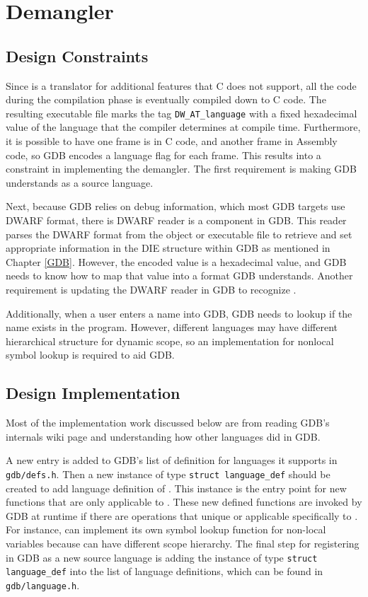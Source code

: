 \chapter{\CFAS Demangler} \label{demangler}

\section{Design Constraints}
Since \CFAS is a translator for additional features that C does not support, all
the code during the compilation phase is eventually compiled down to C code.
The resulting executable file marks the tag \verb|DW_AT_language| with a
fixed hexadecimal value of the language that the compiler determines at compile
time. Furthermore, it is possible to have one frame is in C code, and another
frame in Assembly code, so GDB encodes a language flag for each frame. This
results into a constraint in implementing the demangler. The first requirement is
making GDB understands \CFAS as a source language.

Next, because GDB relies on debug information, which most GDB targets use DWARF
format, there is DWARF reader is a component in GDB. This reader parses the DWARF format from the object or
executable file to retrieve and set
appropriate information in the DIE structure within GDB as mentioned in Chapter
\ref{GDB}. However, the encoded value is a hexadecimal value, and GDB needs to
know how to map that value into a format GDB understands.
Another requirement is updating the DWARF reader in GDB to recognize \CFA.

Additionally, when a user enters a name into GDB, GDB needs to lookup if the
name exists in the program. However, different languages may have different
hierarchical structure for dynamic scope, so an implementation for nonlocal
symbol lookup is required to aid GDB.

\section{Design Implementation}
Most of the implementation work discussed below are from reading GDB's internals
wiki page and understanding how other languages did in GDB\cite{reference5}.

A new entry is added to GDB's list of definition for languages it supports in
\verb|gdb/defs.h|. Then a new instance of type \verb|struct language_def|
should be created to add language definition of \CFAS. This instance is the
entry point for new functions that are only applicable to \CFA. These new
defined functions are invoked by GDB at runtime if there are operations that
unique or applicable specifically to \CFA. For instance, \CFAS can implement its
own symbol lookup function for non-local variables because \CFAS can have
different scope hierarchy. The final step for registering \CFAS in GDB as a new
source language is adding the instance of type \verb|struct language_def| into
the list of language definitions, which can be found in
\verb|gdb/language.h|.

